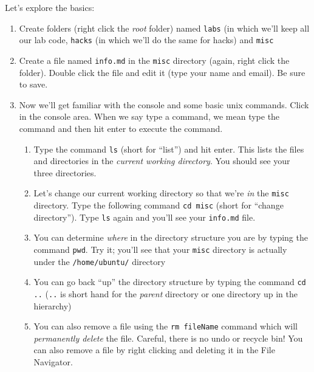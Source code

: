 \documentclass[12pt]{scrartcl}
\begin{document}
Let's explore the basics:
\begin{enumerate}
  \item Create folders (right click the \emph{root} folder) named \texttt{labs} (in which we'll keep all our lab code, \texttt{hacks} (in which we'll do the same for hacks) and \texttt{misc}
  \item Create a file named \texttt{info.md} in the \texttt{misc} directory (again, right click the folder).  Double click the file and edit it (type your name and email).  Be sure to save.
  \item Now we'll get familiar with the console and some basic unix commands.  Click
  in the console area.  When we say type a command, we mean type the command and then
  hit enter to execute the command.
  \begin{enumerate}
    \item Type the command \texttt{ls} (short for ``list'') and 
    hit enter.  This lists the files and directories in the 
    \emph{current working directory}.  You should see your three directories.
    \item Let's change our current working directory so that we're \emph{in}
    the \texttt{misc} directory.  Type the following command
    \texttt{cd misc} (short for ``change directory'').  Type \texttt{ls} again and you'll see your \texttt{info.md} file.
    \item You can determine \emph{where} in the directory structure you are
    by typing the command \texttt{pwd}.  Try it; you'll see that your
    \texttt{misc} directory is actually under the \texttt{/home/ubuntu/} directory
    \item You can go back ``up'' the directory structure by typing the command
    \texttt{cd ..} (\texttt{..} is short hand for the \emph{parent} directory or one directory up in the hierarchy)
    \item You can also remove a file using the \texttt{rm fileName} 
    command which will \emph{permanently delete} the file.  Careful, there
    is no undo or recycle bin!  You can also remove a file by right clicking
    and deleting it in the File Navigator.
  \end{enumerate}
\end{enumerate}

%
\end{document}
